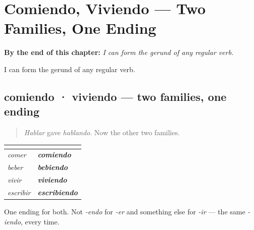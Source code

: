 
\chapter{Comiendo, Viviendo --- Two Families, One Ending}
\label{ch:comiendo}

\begin{chapteropening}
\textbf{By the end of this chapter:} \emph{I can form the gerund of any regular verb.}

I can form the gerund of any regular verb.
\end{chapteropening}

\section[comiendo · viviendo]{comiendo · viviendo — two families, one ending}

\label{lesson:ES-C62-comiendo}



\begin{quote}
\emph{Hablar} gave \emph{hablando}. Now the other two families.
\end{quote}

\begin{grammarlens}[title={Grammar Lens: -iendo, for both}]
\noindent
\begin{tabularx}{\linewidth}{@{}>{\raggedright\arraybackslash}X>{\raggedright\arraybackslash}X@{}}
\toprule
\textbf{} & \textbf{} \\
\midrule
\emph{comer} & \emph{\textbf{comiendo}} \\
\emph{beber} & \emph{\textbf{bebiendo}} \\
\emph{vivir} & \emph{\textbf{viviendo}} \\
\emph{escribir} & \emph{\textbf{escribiendo}} \\
\bottomrule
\end{tabularx}

One ending for both. Not \emph{-endo} for \emph{-er} and something else for \emph{-ir} — the same \emph{-iendo}, every time.
\end{grammarlens}

